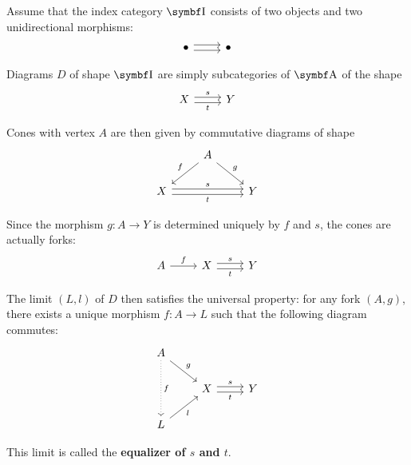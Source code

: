 \begin{definition}\label{def:categorical_equalizer}\cite[definition 5.1.11]{Leinster2014}
  Assume that the index category \( \Bold I \) consists of two objects and two unidirectional morphisms:
  \begin{equation*}
    \begin{tikzcd}
      \bullet \arrow[r, shift left=1] \arrow[r, shift right=1] & \bullet
    \end{tikzcd}
  \end{equation*}

  Diagrams \( D \) of shape \( \Bold I \) are simply subcategories of \( \Bold A \) of the shape
  \begin{equation*}
    \begin{tikzcd}
      X \arrow[r, shift left=1, "s"] \arrow[r, shift right=1, "t"'] & Y
    \end{tikzcd}
  \end{equation*}

  Cones with vertex \( A \) are then given by commutative diagrams of shape
  \begin{equation*}
    \begin{tikzcd}
      & A \arrow[ld, "f"'] \arrow[rd, "g"] & \\
      X \arrow[rr, shift left=1, "s"] \arrow[rr, shift right=1, "t"'] && Y
    \end{tikzcd}
  \end{equation*}

  Since the morphism \( g: A \to Y \) is determined uniquely by \( f \) and \( s \), the cones are actually forks:
  \begin{equation*}
    \begin{tikzcd}
      A \arrow[r, "f"] & X \arrow[r, shift left=1, "s"] \arrow[r, shift right=1, "t"'] & Y
    \end{tikzcd}
  \end{equation*}

  The limit \( (L, l) \) of \( D \) then satisfies the universal property: for any fork \( (A, g) \), there exists a unique morphism \( f: A \to L \) such that the following diagram commutes:
  \begin{equation*}
    \begin{tikzcd}
      A \arrow[rd, "g"] \arrow[dd, "f", dotted] & & \\
      & X \arrow[r, shift left=1, "s"] \arrow[r, shift right=1, "t"'] & Y \\
      L \arrow[ru, "l"'] & &
    \end{tikzcd}
  \end{equation*}

  This limit is called the \textbf{equalizer of \( s \) and \( t \)}.
\end{definition}

